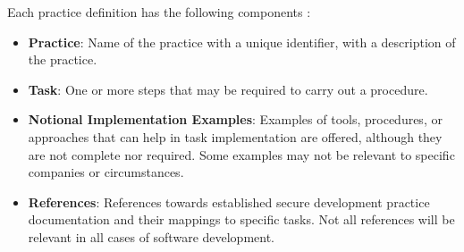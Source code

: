 Each practice definition has the following components \cite{ssdf}:
\begin{itemize}
  \item \textbf{Practice}: Name of the practice with a unique identifier, with a description of the practice. 
  \item \textbf{Task}: One or more steps that may be required to carry out a procedure.
  \item \textbf{Notional Implementation Examples}: Examples of tools, procedures, or approaches that can help in task implementation are offered, although they are not complete nor required. Some examples may not be relevant to specific companies or circumstances.
  \item \textbf{References}: References towards established secure development practice documentation and their mappings to specific tasks. Not all references will be relevant in all cases of software development. 
\end{itemize}
